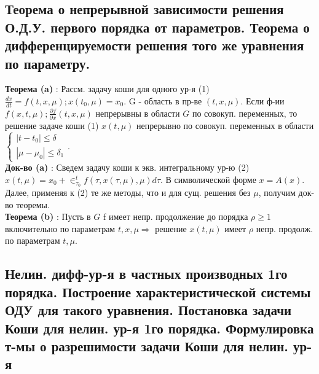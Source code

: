 \documentclass[unicode, 8pt, a4paper,oneside, landscape]{article}
\begin{document}
\begin{multicols}{4}
\subsection{Теорема о непрерывной зависимости решения О.Д.У. первого порядка от параметров. Теорема о дифференцируемости решения того же уравнения по параметру.}

{\bf Теорема (a)} : Рассм. задачу коши для одного ур-я (1) $\frac{dx}{dt} = f(t, x, \mu); x(t_0, \mu) = x_0$. G - область в пр-ве $(t, x, \mu)$. Если ф-ии $f(x, t, \mu); \frac{\partial f}{\partial x}(t, x, \mu)$ непрерывны в области $G$ по совокуп. переменных, то решение задаче коши (1) $x(t, \mu)$ непрерывно по совокуп. переменных в области $\begin{cases} |t-t_0| \leq \delta \\ |\mu - \mu_0| \leq \delta_1 \end{cases}$.\\
{\bf Док-во (a)} : Сведем задачу коши к экв. интегральному ур-ю (2) $x(t, \mu) = x_0 + \in_{\tau_0}^t f(\tau, x(\tau, \mu), \mu)d\tau$. В символической форме $x=A(x)$. Далее, применяя к (2) те же методы, что и для сущ. решения без $\mu$, получим док-во теоремы.\\
{\bf Теорема (b)} : Пусть в $G$ f имеет непр. продолжение до порядка $\rho \geq 1$ включительно по параметрам $t, x, \mu \Rightarrow$ решение $x(t, \mu)$ имеет $\rho$  непр. продолж. по параметрам $t, \mu$.


\subsection{Нелин. дифф-ур-я в частных производных 1го порядка. Построение характеристической системы ОДУ для такого уравнения. Постановка задачи Коши для нелин. ур-я 1го порядка. Формулировка т-мы о разрешимости задачи Коши для нелин. ур-я}


\end{multicols}
\end{document}
